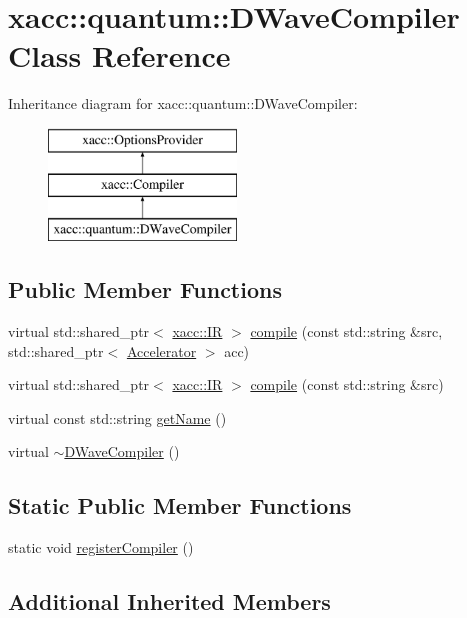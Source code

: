 \hypertarget{a00024}{}\section{xacc\+:\+:quantum\+:\+:D\+Wave\+Compiler Class Reference}
\label{a00024}
Inheritance diagram for xacc\+:\+:quantum\+:\+:D\+Wave\+Compiler\+:\begin{figure}[H]
\begin{center}
\leavevmode
\includegraphics[height=3.000000cm]{a00024}
\end{center}
\end{figure}
\subsection*{Public Member Functions}
\begin{DoxyCompactItemize}
\item 
virtual std\+::shared\+\_\+ptr$<$ \hyperlink{a00041}{xacc\+::\+IR} $>$ \hyperlink{a00024_a0f7f6b10b4a881cb27b36eaa6d39e7b1}{compile} (const std\+::string \&src, std\+::shared\+\_\+ptr$<$ \hyperlink{a00011}{Accelerator} $>$ acc)
\item 
virtual std\+::shared\+\_\+ptr$<$ \hyperlink{a00041}{xacc\+::\+IR} $>$ \hyperlink{a00024_a893e1d1c81a8aaf6e2435c9bceab575e}{compile} (const std\+::string \&src)
\item 
virtual const std\+::string \hyperlink{a00024_a8a180031ae563e1a9aac611e8066c181}{get\+Name} ()
\item 
virtual \hyperlink{a00024_acc0ab28f787b8f4cbeb63c594a247e50}{$\sim$\+D\+Wave\+Compiler} ()
\end{DoxyCompactItemize}
\subsection*{Static Public Member Functions}
\begin{DoxyCompactItemize}
\item 
static void \hyperlink{a00024_a5b221649f22a9bb4d4a304a6522d071f}{register\+Compiler} ()
\end{DoxyCompactItemize}
\subsection*{Additional Inherited Members}


